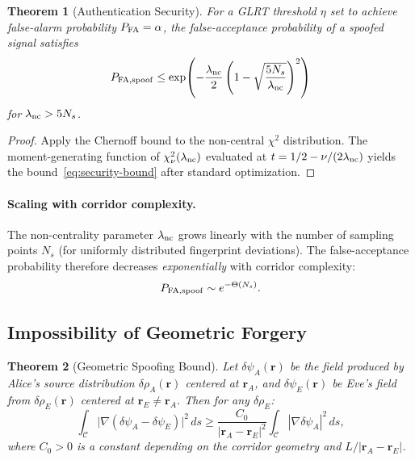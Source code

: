 \documentclass[twocolumn,superscriptaddress,prd,nofootinbib]{revtex4-2}
\newcommand{\Corridor}{\mathcal{C}}
\newtheorem{theorem}{Theorem}
\begin{document}
\begin{theorem}[Authentication Security]\label{thm:security}
For a GLRT threshold $\eta$ set to achieve false-alarm probability
$P_{\rm FA} = \alpha$, the false-acceptance probability of a spoofed
signal satisfies
\begin{equation}
P_{\rm FA,spoof} \leq \exp\!\left(-\frac{\lambda_{\rm nc}}{2}
\left(1 - \sqrt{\frac{5N_s}{\lambda_{\rm nc}}}\right)^2\right)
\label{eq:security-bound}
\end{equation}
for $\lambda_{\rm nc} > 5N_s$.
\end{theorem}

\begin{proof}
Apply the Chernoff bound to the non-central $\chi^2$ distribution.
The moment-generating function of $\chi^2_\nu(\lambda_{\rm nc})$
evaluated at $t = 1/2 - \nu/(2\lambda_{\rm nc})$ yields the
bound~\eqref{eq:security-bound} after standard optimization.
\end{proof}

\paragraph{Scaling with corridor complexity.}
The non-centrality parameter $\lambda_{\rm nc}$ grows linearly with the
number of sampling points $N_s$ (for uniformly distributed fingerprint
deviations).
The false-acceptance probability therefore decreases
\emph{exponentially} with corridor complexity:
\begin{equation}
P_{\rm FA,spoof} \sim e^{-\Theta(N_s)}.
\label{eq:exponential-security}
\end{equation}

\subsection{Impossibility of Geometric Forgery}

\begin{theorem}[Geometric Spoofing Bound]\label{thm:forgery}
Let $\delta\psi_A(\mathbf{r})$ be the field produced by Alice's source
distribution $\delta\rho_A(\mathbf{r})$ centered at $\mathbf{r}_A$, and
$\delta\psi_E(\mathbf{r})$ be Eve's field from $\delta\rho_E(\mathbf{r})$
centered at $\mathbf{r}_E \neq \mathbf{r}_A$.
Then for any $\delta\rho_E$:
\begin{equation}
\int_\Corridor \bigl|\nabla(\delta\psi_A - \delta\psi_E)\bigr|^2\,ds
\geq \frac{C_0}{|\mathbf{r}_A - \mathbf{r}_E|^2}\int_\Corridor
|\nabla\delta\psi_A|^2\,ds,
\label{eq:forgery-bound}
\end{equation}
where $C_0 > 0$ is a constant depending on the corridor geometry and
$L/|\mathbf{r}_A - \mathbf{r}_E|$.
\end{theorem}
\end{document}
